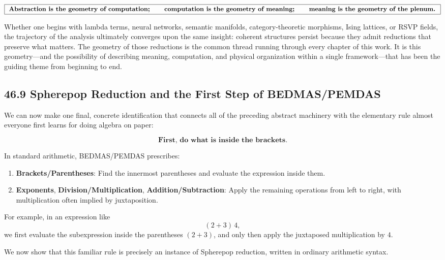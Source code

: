 \documentclass[12pt,letterpaper]{article}
\theoremstyle{remark}
\begin{document}
\[
\boxed{
\textbf{
Abstraction is the geometry of computation;\qquad
computation is the geometry of meaning;\qquad
meaning is the geometry of the plenum.
}
}
\]

Whether one begins with lambda terms, neural networks, semantic manifolds, category-theoretic morphisms, Ising lattices, or RSVP fields, the trajectory of the analysis ultimately converges upon the same insight: coherent structures persist because they admit reductions that preserve what matters. The geometry of those reductions is the common thread running through every chapter of this work. It is this geometry—and the possibility of describing meaning, computation, and physical organization within a single framework—that has been the guiding theme from beginning to end.

\newpage

\subsection{46.9 Spherepop Reduction and the First Step of BEDMAS/PEMDAS}

We can now make one final, concrete identification that connects all of the
preceding abstract machinery with the elementary rule almost everyone first
learns for doing algebra on paper:

\[
\textbf{First, do what is inside the brackets.}
\]

In standard arithmetic, BEDMAS/PEMDAS prescribes:

\begin{enumerate}
  \item \textbf{Brackets/Parentheses}: Find the innermost parentheses and evaluate the expression inside them.
  \item \textbf{Exponents}, \textbf{Division/Multiplication}, \textbf{Addition/Subtraction}: Apply the remaining operations from left to right, with multiplication often implied by juxtaposition.
\end{enumerate}

For example, in an expression like
\[
(2 + 3)\,4,
\]
we first evaluate the subexpression inside the parentheses $(2+3)$, and only
then apply the juxtaposed multiplication by $4$.

We now show that this familiar rule is precisely an instance of Spherepop
reduction, written in ordinary arithmetic syntax.
\end{document}
